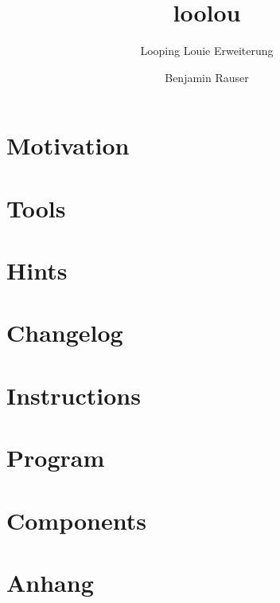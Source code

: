 \documentclass[a4paper]{scrartcl}
\begin{document}
	\author{Benjamin Rauser}
	\title{loolou}
	\subtitle{Looping Louie Erweiterung}

	
	\newpage

	\tableofcontents
	\newpage

	\section{Motivation}
	
	\newpage

	\section{Tools}
	

	\section{Hints}
	
	\newpage

	\section{Changelog}
	
	\newpage

	\section{Instructions}
	
	\newpage

	\section{Program}
	
	\newpage

	\section{Components}
	
	\newpage

	\listoffigures

	\listoftables

	\lstlistoflistings
	\newpage

	\section{Anhang}
	
\end{document}
